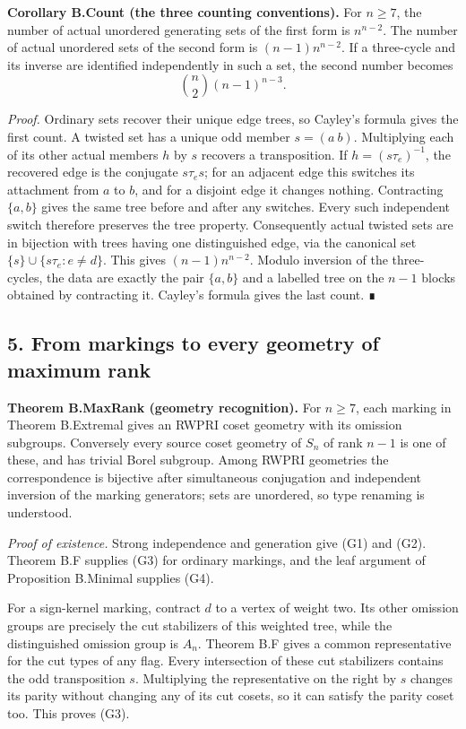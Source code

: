 \documentclass[
  11pt,
  a4paper,
]{article}
\begin{document}
\textbf{Corollary B.Count (the three counting conventions).} For
\(n\geq7\), the number of actual unordered generating sets of the first
form is \(n^{n-2}\). The number of actual unordered sets of the second
form is \((n-1)n^{n-2}\). If a three-cycle and its inverse are
identified independently in such a set, the second number becomes \[
\binom n2(n-1)^{n-3}.
\]

\emph{Proof.} Ordinary sets recover their unique edge trees, so Cayley's
formula gives the first count. A twisted set has a unique odd member
\(s=(a\ b)\). Multiplying each of its other actual members \(h\) by
\(s\) recovers a transposition. If \(h=(s\tau_e)^{-1}\), the recovered
edge is the conjugate \(s\tau_es\); for an adjacent edge this switches
its attachment from \(a\) to \(b\), and for a disjoint edge it changes
nothing. Contracting \(\{a,b\}\) gives the same tree before and after
any switches. Every such independent switch therefore preserves the tree
property. Consequently actual twisted sets are in bijection with trees
having one distinguished edge, via the canonical set
\(\{s\}\cup\{s\tau_e:e\ne d\}\). This gives \((n-1)n^{n-2}\). Modulo
inversion of the three-cycles, the data are exactly the pair \(\{a,b\}\)
and a labelled tree on the \(n-1\) blocks obtained by contracting it.
Cayley's formula gives the last count. ∎

\subsection{5. From markings to every geometry of maximum
rank}\label{from-markings-to-every-geometry-of-maximum-rank}

\textbf{Theorem B.MaxRank (geometry recognition).} For \(n\geq7\), each
marking in Theorem B.Extremal gives an RWPRI coset geometry with its
omission subgroups. Conversely every source coset geometry of \(S_n\) of
rank \(n-1\) is one of these, and has trivial Borel subgroup. Among
RWPRI geometries the correspondence is bijective after simultaneous
conjugation and independent inversion of the marking generators; sets
are unordered, so type renaming is understood.

\emph{Proof of existence.} Strong independence and generation give (G1)
and (G2). Theorem B.F supplies (G3) for ordinary markings, and the leaf
argument of Proposition B.Minimal supplies (G4).

For a sign-kernel marking, contract \(d\) to a vertex of weight two. Its
other omission groups are precisely the cut stabilizers of this weighted
tree, while the distinguished omission group is \(A_n\). Theorem B.F
gives a common representative for the cut types of any flag. Every
intersection of these cut stabilizers contains the odd transposition
\(s\). Multiplying the representative on the right by \(s\) changes its
parity without changing any of its cut cosets, so it can satisfy the
parity coset too. This proves (G3).
\end{document}
